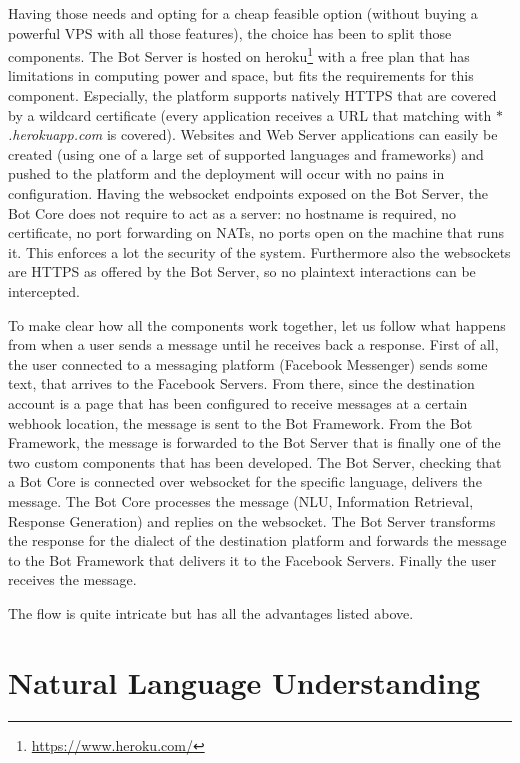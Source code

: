 Having those needs and opting for a cheap feasible option (without buying a powerful VPS with all those features), the choice has been to split those components. The Bot Server is hosted on heroku\footnote{\url{https://www.heroku.com/}} with a free plan that has limitations in computing power and space, but fits the requirements for this component. Especially, the platform supports natively HTTPS that are covered by a wildcard certificate (every application receives a URL that matching with \textit{$\ast$ .herokuapp.com} is covered). Websites and Web Server applications can easily be created (using one of a large set of supported languages and frameworks) and pushed to the platform and the deployment will occur with no pains in configuration. Having the websocket endpoints exposed on the Bot Server, the Bot Core does not require to act as a server: no hostname is required, no certificate, no port forwarding on NATs, no ports open on the machine that runs it. This enforces a lot the security of the system. Furthermore also the websockets are HTTPS as offered by the Bot Server, so no plaintext interactions can be intercepted.

To make clear how all the components work together, let us follow what happens from when a user sends a message until he receives back a response. First of all, the user connected to a messaging platform (Facebook Messenger) sends some text, that arrives to the Facebook Servers. From there, since the destination account is a page that has been configured to receive messages at a certain webhook location, the message is sent to the Bot Framework. From the Bot Framework, the message is forwarded to the Bot Server that is finally one of the two custom components that has been developed. The Bot Server, checking that a Bot Core is connected over websocket for the specific language, delivers the message. The Bot Core processes the message (NLU, Information Retrieval, Response Generation) and replies on the websocket. The Bot Server transforms the response for the dialect of the destination platform and forwards the message to the Bot Framework that delivers it to the Facebook Servers. Finally the user receives the message.

The flow is quite intricate but has all the advantages listed above.

\section{Natural Language Understanding}
\label{implementationNLU}

